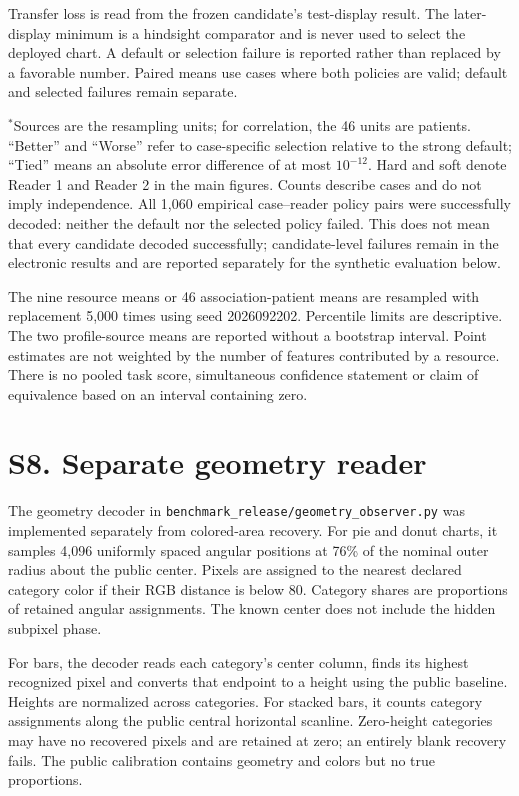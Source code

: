 \documentclass[10pt]{article}
\begin{document}
Transfer loss is read from the frozen candidate's test-display result. The later-display minimum is a hindsight comparator and is never used to select the deployed chart. A default or selection failure is reported rather than replaced by a favorable number. Paired means use cases where both policies are valid; default and selected failures remain separate.


\noindent $^*$Sources are the resampling units; for correlation, the 46 units are patients. ``Better'' and ``Worse'' refer to case-specific selection relative to the strong default; ``Tied'' means an absolute error difference of at most $10^{-12}$. Hard and soft denote Reader 1 and Reader 2 in the main figures. Counts describe cases and do not imply independence. All 1,060 empirical case--reader policy pairs were successfully decoded: neither the default nor the selected policy failed. This does not mean that every candidate decoded successfully; candidate-level failures remain in the electronic results and are reported separately for the synthetic evaluation below.

The nine resource means or 46 association-patient means are resampled with replacement 5,000 times using seed 2026092202. Percentile limits are descriptive. The two profile-source means are reported without a bootstrap interval. Point estimates are not weighted by the number of features contributed by a resource. There is no pooled task score, simultaneous confidence statement or claim of equivalence based on an interval containing zero.

\section*{S8. Separate geometry reader}
The geometry decoder in \texttt{benchmark\_release/geometry\_observer.py} was implemented separately from colored-area recovery. For pie and donut charts, it samples 4,096 uniformly spaced angular positions at 76\% of the nominal outer radius about the public center. Pixels are assigned to the nearest declared category color if their RGB distance is below 80. Category shares are proportions of retained angular assignments. The known center does not include the hidden subpixel phase.

For bars, the decoder reads each category's center column, finds its highest recognized pixel and converts that endpoint to a height using the public baseline. Heights are normalized across categories. For stacked bars, it counts category assignments along the public central horizontal scanline. Zero-height categories may have no recovered pixels and are retained at zero; an entirely blank recovery fails. The public calibration contains geometry and colors but no true proportions.
\end{document}
